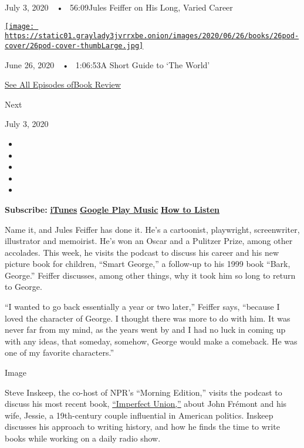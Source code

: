July 3, 2020~~•~ 56:09Jules Feiffer on His Long, Varied Career

\href{https://www.nytimes3xbfgragh.onion/2020/06/26/books/review/podcast-richard-haass-world-brief-introduction.html?action=click\&module=audio-series-bar\&region=header\&pgtype=Article}{\texttt{[image: https://static01.graylady3jvrrxbe.onion/images/2020/06/26/books/26pod-cover/26pod-cover-thumbLarge.jpg]}}

June 26, 2020~~•~ 1:06:53A Short Guide to `The World'

\href{https://www.nytimes3xbfgragh.onion/column/book-review-podcast}{See
All Episodes ofBook Review}

Next

July 3, 2020

\begin{itemize}
\item
\item
\item
\item
\item
\end{itemize}

\textbf{Subscribe:}
\textbf{\href{https://itunes.apple.com/us/podcast/book-review/id120315179?mt=2}{iTunes}}
\textbf{\textbar{}}
\textbf{\href{https://play.google.com/music/listen?u=0\#/ps/Iv6zeb5qwjtzjfbyo3vy5zny5ky}{Google
Play Music}} \textbf{\textbar{}}
\textbf{\href{https://www.nytimes3xbfgragh.onion/2018/08/03/books/review/how-to-listen-to-the-book-review-podcast.html}{How
to Listen}}

Name it, and Jules Feiffer has done it. He's a cartoonist, playwright,
screenwriter, illustrator and memoirist. He's won an Oscar and a
Pulitzer Prize, among other accolades. This week, he visits the podcast
to discuss his career and his new picture book for children, ``Smart
George,'' a follow-up to his 1999 book ``Bark, George.'' Feiffer
discusses, among other things, why it took him so long to return to
George.

``I wanted to go back essentially a year or two later,'' Feiffer says,
``because I loved the character of George. I thought there was more to
do with him. It was never far from my mind, as the years went by and I
had no luck in coming up with any ideas, that someday, somehow, George
would make a comeback. He was one of my favorite characters.''

Image

Steve Inskeep, the co-host of NPR's ``Morning Edition,'' visits the
podcast to discuss his most recent book,
\href{https://www.nytimes3xbfgragh.onion/2020/01/14/books/review-imperfect-union-steve-inskeep-jessie-john-fremont-civil-war.html}{``Imperfect
Union,''} about John Frémont and his wife, Jessie, a 19th-century couple
influential in American politics. Inskeep discusses his approach to
writing history, and how he finds the time to write books while working
on a daily radio show.

